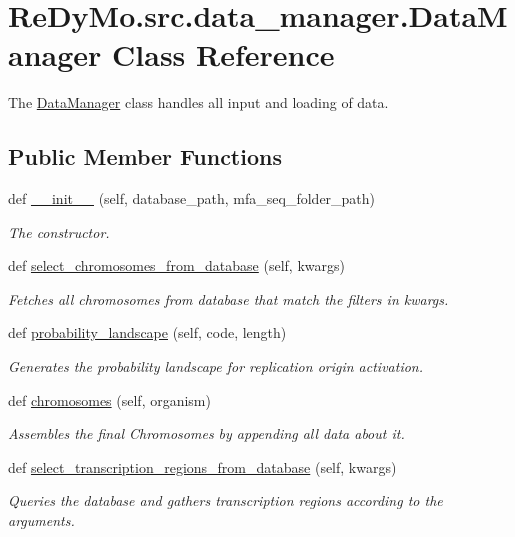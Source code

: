 \hypertarget{classReDyMo_1_1src_1_1data__manager_1_1DataManager}{}\section{Re\+Dy\+Mo.\+src.\+data\+\_\+manager.\+Data\+Manager Class Reference}
\label{classReDyMo_1_1src_1_1data__manager_1_1DataManager}


The \mbox{\hyperlink{classReDyMo_1_1src_1_1data__manager_1_1DataManager}{Data\+Manager}} class handles all input and loading of data.  


\subsection*{Public Member Functions}
\begin{DoxyCompactItemize}
\item 
def \mbox{\hyperlink{classReDyMo_1_1src_1_1data__manager_1_1DataManager_a27b99e0e717df27a816eb1d2db550847}{\+\_\+\+\_\+init\+\_\+\+\_\+}} (self, database\+\_\+path, mfa\+\_\+seq\+\_\+folder\+\_\+path)
\begin{DoxyCompactList}\small\item\em The constructor. \end{DoxyCompactList}\item 
def \mbox{\hyperlink{classReDyMo_1_1src_1_1data__manager_1_1DataManager_afc9590b6ec6ab95c33bfa2f44b0da404}{select\+\_\+chromosomes\+\_\+from\+\_\+database}} (self, kwargs)
\begin{DoxyCompactList}\small\item\em Fetches all chromosomes from database that match the filters in kwargs. \end{DoxyCompactList}\item 
def \mbox{\hyperlink{classReDyMo_1_1src_1_1data__manager_1_1DataManager_ac8933073eed38e7669e162884d89cda8}{probability\+\_\+landscape}} (self, code, length)
\begin{DoxyCompactList}\small\item\em Generates the probability landscape for replication origin activation. \end{DoxyCompactList}\item 
def \mbox{\hyperlink{classReDyMo_1_1src_1_1data__manager_1_1DataManager_ae36fd09e981be096578336def0a04069}{chromosomes}} (self, organism)
\begin{DoxyCompactList}\small\item\em Assembles the final Chromosomes by appending all data about it. \end{DoxyCompactList}\item 
def \mbox{\hyperlink{classReDyMo_1_1src_1_1data__manager_1_1DataManager_acfb4a6c0196739c8afc556269ce9ab47}{select\+\_\+transcription\+\_\+regions\+\_\+from\+\_\+database}} (self, kwargs)
\begin{DoxyCompactList}\small\item\em Queries the database and gathers transcription regions according to the arguments. \end{DoxyCompactList}\end{DoxyCompactItemize}

